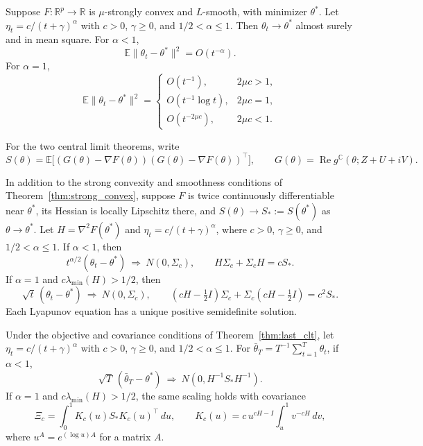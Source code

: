 \begin{theorem}
\label{thm:strong_convex}
Suppose $F:\mathbb R^p\to\mathbb R$ is $\mu$-strongly convex and
$L$-smooth, with minimizer $\theta^*$. Let
$\eta_t=c/(t+\gamma)^\alpha$ with $c>0$, $\gamma\ge0$, and
$1/2<\alpha\le1$. Then $\theta_t\to\theta^*$ almost surely and in
mean square. For $\alpha<1$,
\[
\mathbb E\|\theta_t-\theta^*\|^2=O(t^{-\alpha}).
\]
For $\alpha=1$,
\[
\mathbb E\|\theta_t-\theta^*\|^2=
\begin{cases}
O(t^{-1}), & 2\mu c>1,\\
O(t^{-1}\log t), & 2\mu c=1,\\
O(t^{-2\mu c}), & 2\mu c<1.
\end{cases}
\]

\end{theorem}

For the two central limit theorems, write
\[
S(\theta)=\mathbb E\bigl[(G(\theta)-\nabla F(\theta))
(G(\theta)-\nabla F(\theta))^\top\bigr],\qquad
G(\theta)=\operatorname{Re}g^{\mathbb C}(\theta;Z+U+iV).
\]

\begin{theorem}\label{thm:last_clt}
In addition to the strong convexity and smoothness conditions of
Theorem~\ref{thm:strong_convex}, suppose $F$ is twice continuously
differentiable near $\theta^*$, its Hessian is locally Lipschitz there,
and $S(\theta)\to S_*:=S(\theta^*)$ as $\theta\to\theta^*$.
Let $H=\nabla^2F(\theta^*)$ and
$\eta_t=c/(t+\gamma)^\alpha$, where $c>0$, $\gamma\ge0$, and
$1/2<\alpha\le1$. If $\alpha<1$, then
\[
t^{\alpha/2}(\theta_t-\theta^*)\ \Rightarrow\ N(0,\Sigma_c),
\qquad H\Sigma_c+\Sigma_c H=cS_*.
\]
If $\alpha=1$ and $c\lambda_{\min}(H)>1/2$, then
\[
\sqrt t\,(\theta_t-\theta^*)\ \Rightarrow\ N(0,\Sigma_c),
\qquad
(cH-\tfrac12 I)\Sigma_c
+\Sigma_c(cH-\tfrac12 I)=c^2S_*.
\]
Each Lyapunov equation has a unique positive semidefinite solution.
\end{theorem}

\begin{theorem}\label{thm:pr_clt}
Under the objective and covariance conditions of
Theorem~\ref{thm:last_clt}, let $\eta_t=c/(t+\gamma)^\alpha$ with
$c>0$, $\gamma\ge0$, and $1/2<\alpha\le1$.
For $\bar\theta_T=T^{-1}\sum_{t=1}^T\theta_t$,
if $\alpha<1$,
\[
\sqrt T\,(\bar\theta_T-\theta^*)
\ \Rightarrow\ N(0,H^{-1}S_*H^{-1}).
\]
If $\alpha=1$ and $c\lambda_{\min}(H)>1/2$, the same scaling holds
with covariance
\[
\Xi_c=\int_0^1 K_c(u)S_*K_c(u)^\top\,du,
\qquad
K_c(u)=c\,u^{cH-I}\int_u^1 v^{-cH}\,dv,
\]
where $u^A=e^{(\log u)A}$ for a matrix $A$.
\end{theorem}

